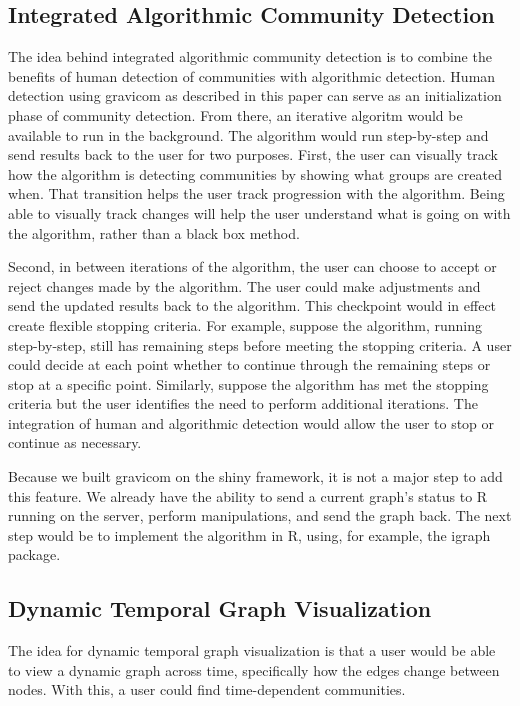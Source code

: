 \documentclass{article}\usepackage[]{graphicx}\usepackage[]{color}
\begin{document}
\subsection{Integrated Algorithmic Community Detection}
The idea behind integrated algorithmic community detection is to combine the benefits of human detection of communities with algorithmic detection. Human detection using gravicom as described in this paper can serve as an initialization phase of community detection. From there, an iterative algoritm would be available to run in the background. The algorithm would run step-by-step and send results back to the user for two purposes. First, the user can visually track how the algorithm is detecting communities by showing what groups are created when. That transition helps the user track progression with the algorithm.  Being able to visually track changes will help the user understand what is going on with the algorithm, rather than a black box method. 

Second, in between iterations of the algorithm, the user can choose to accept or reject changes made by the algorithm. The user could make adjustments and send the updated results back to the algorithm. This checkpoint would in effect create flexible stopping criteria.  For example, suppose the algorithm, running step-by-step, still has remaining steps before meeting the stopping criteria.  A user could decide at each point whether to continue through the remaining steps or stop at a specific point.  Similarly, suppose the algorithm has met the stopping criteria but the user identifies the need to perform additional iterations.  The integration of human and algorithmic detection would allow the user to stop or continue as necessary.

Because we built gravicom on the shiny framework, it is not a major step to add this feature. We already have the ability to send a current graph's status to R running on the server, perform manipulations, and send the graph back. The next step would be to implement the algorithm in R, using, for example, the igraph package.

\subsection{Dynamic Temporal Graph Visualization}
The idea for dynamic temporal graph visualization is that a user would be able to view a dynamic graph across time, specifically how the edges change between nodes. With this, a user could find time-dependent communities. 
\end{document}
